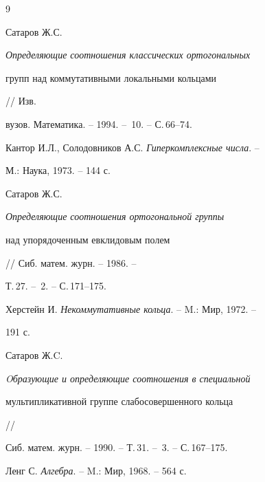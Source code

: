 \begin{thebibliography}{9} 


 




Сатаров Ж.С. {\em Определяющие соотношения классических ортогональных 


групп над коммутативными локальными кольцами} // Изв. 


вузов. Математика. -- 1994. -- \No\,10. -- С.\,66--74. 




Кантор И.Л., Солодовников А.С. {\em Гиперкомплексные числа}. -- 


М.: Наука, 1973. -- 144 с. 




Сатаров Ж.С. {\em Определяющие соотношения ортогональной группы 


над упорядоченным евклидовым полем} // Сиб. матем. журн. -- 1986. -- 


Т.\,27. -- \No\,2. -- С.\,171--175. 




Херстейн И. {\em Некоммутативные кольца}. -- M.: Мир, 1972. -- 


191 с. 




Сатаров Ж.C. {\em Oбразующие и определяющие соотношения в специальной 


мультипликативной группе слабосовершенного кольца} // 


Сиб. матем. журн. -- 1990. -- Т.\,31. -- \No\,3. -- С.\,167--175. 




Ленг С. {\em Алгебра}. -- M.: Мир, 1968. -- 564 с. 


 


\end{thebibliography} 


 


\vskip 2cm 


 






 


\label{end} 


 


 


